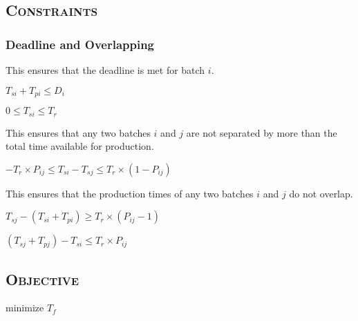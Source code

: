 \documentclass{article}
\begin{document}
\subsection*{\textsc{Constraints}}
\subsubsection*{Deadline and Overlapping}
\noindent This ensures that the deadline is met for batch $i$.

$T_{si} + T_{pi} \leq D_i$

$0 \leq T_{si} \leq T_r$

\noindent This ensures that any two batches $i$ and $j$ are not separated by more than the total time available for production.

$-T_r \times P_{ij} \leq T_{si} - T_{sj} \leq T_r \times (1 - P_{ij})$

\noindent This ensures that the production times of any two batches $i$ and $j$ do not overlap.

$T_{sj} - (T_{si} + T_{pi}) \geq T_r \times (P_{ij} - 1)$

$(T_{sj} + T_{pj}) - T_{si} \leq T_r \times P_{ij}$

\subsection*{\textsc{Objective}}
minimize $T_f$
\end{document}
